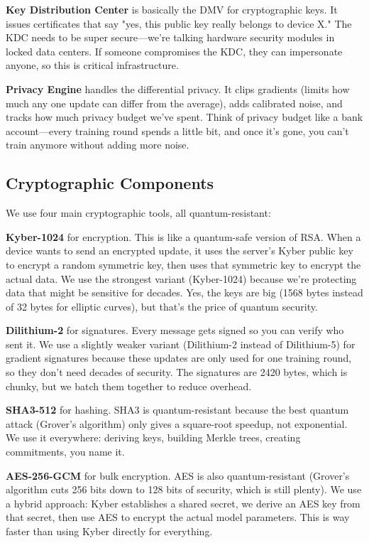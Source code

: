 \documentclass[journal]{IEEEtran}
\begin{document}
\textbf{Key Distribution Center} is basically the DMV for cryptographic keys. It issues certificates that say "yes, this public key really belongs to device X." The KDC needs to be super secure—we're talking hardware security modules in locked data centers. If someone compromises the KDC, they can impersonate anyone, so this is critical infrastructure.

\textbf{Privacy Engine} handles the differential privacy. It clips gradients (limits how much any one update can differ from the average), adds calibrated noise, and tracks how much privacy budget we've spent. Think of privacy budget like a bank account—every training round spends a little bit, and once it's gone, you can't train anymore without adding more noise.

\subsection{Cryptographic Components}

We use four main cryptographic tools, all quantum-resistant:

\textbf{Kyber-1024} for encryption. This is like a quantum-safe version of RSA. When a device wants to send an encrypted update, it uses the server's Kyber public key to encrypt a random symmetric key, then uses that symmetric key to encrypt the actual data. We use the strongest variant (Kyber-1024) because we're protecting data that might be sensitive for decades. Yes, the keys are big (1568 bytes instead of 32 bytes for elliptic curves), but that's the price of quantum security.

\textbf{Dilithium-2} for signatures. Every message gets signed so you can verify who sent it. We use a slightly weaker variant (Dilithium-2 instead of Dilithium-5) for gradient signatures because these updates are only used for one training round, so they don't need decades of security. The signatures are 2420 bytes, which is chunky, but we batch them together to reduce overhead.

\textbf{SHA3-512} for hashing. SHA3 is quantum-resistant because the best quantum attack (Grover's algorithm) only gives a square-root speedup, not exponential. We use it everywhere: deriving keys, building Merkle trees, creating commitments, you name it.

\textbf{AES-256-GCM} for bulk encryption. AES is also quantum-resistant (Grover's algorithm cuts 256 bits down to 128 bits of security, which is still plenty). We use a hybrid approach: Kyber establishes a shared secret, we derive an AES key from that secret, then use AES to encrypt the actual model parameters. This is way faster than using Kyber directly for everything.
\end{document}

